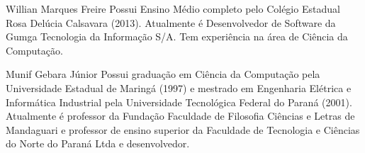 \documentclass[journal]{IEEEtran}
\begin{document}
\begin{IEEEbiography}{Willian Marques Freire}
Possui Ensino Médio completo pelo Colégio Estadual Rosa Delúcia Calsavara (2013). Atualmente é Desenvolvedor de Software da Gumga Tecnologia da Informação S/A. Tem experiência na área de Ciência da Computação.
\end{IEEEbiography}

\begin{IEEEbiography}{Munif Gebara Júnior}
Possui graduação em Ciência da Computação pela Universidade Estadual de Maringá (1997) e mestrado em Engenharia Elétrica e Informática Industrial pela Universidade Tecnológica Federal do Paraná (2001). Atualmente é professor da Fundação Faculdade de Filosofia Ciências e Letras de Mandaguari e professor de ensino superior da Faculdade de Tecnologia e Ciências do Norte do Paraná Ltda e desenvolvedor.
\end{IEEEbiography}
\end{document}
